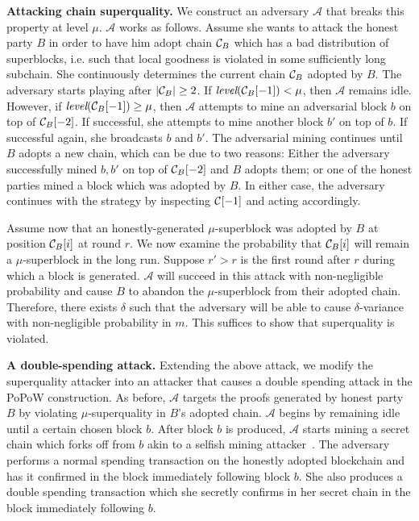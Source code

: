 \noindent
\textbf{Attacking chain superquality.}
\label{subsec.superquality-attack}
We construct an adversary $\mathcal{A}$ that breaks this property at level $\mu$.
$\mathcal{A}$ works as follows. Assume she wants to attack the honest party $B$
in order to have him adopt chain $\mathcal{C}_B$ which has a bad distribution of
superblocks, i.e. such that local goodness is violated in some sufficiently long
subchain. She continuously determines the current chain $\mathcal{C}_B$ adopted by
$B$. The adversary starts playing after $|\mathcal{C}_B| \geq 2$. If
$\textit{level}(\mathcal{C}_B[-1]) < \mu$, then $\mathcal{A}$ remains idle. However,
if $\textit{level}(\mathcal{C}_B[-1]) \geq \mu$, then $\mathcal{A}$ attempts to mine
an adversarial block $b$ on top of $\mathcal{C}_B[-2]$. If successful,  she attempts
to mine another block $b'$ on top of $b$. If successful again, she broadcasts
$b$ and $b'$. The adversarial mining continues until $B$ adopts a new chain,
which can be due to two reasons: Either the adversary successfully mined $b, b'$
on top of $\mathcal{C}_B[-2]$ and $B$ adopts them; or one of the honest parties mined
a block which was adopted by $B$. In either case, the adversary continues with
the strategy by inspecting $\mathcal{C}[-1]$ and acting accordingly.

Assume now that an honestly-generated $\mu$-superblock was adopted by $B$ at
position $\mathcal{C}_B[i]$ at round $r$. We now examine the probability that
$\mathcal{C}_B[i]$ will remain a $\mu$-superblock in the long run. Suppose $r' > r$
is the first round after $r$ during which a block is generated. $\mathcal{A}$
will succeed in this attack with non-negligible probability and cause $B$ to
abandon the $\mu$-superblock from their adopted chain. Therefore, there  
exists $\delta$ such that the adversary will be able to cause $\delta$-variance
with non-negligible probability in $m$. This suffices to show that superquality
is violated.

\noindent
\textbf{A double-spending attack. }
Extending the above attack, we modify the superquality attacker into an attacker
that causes a double spending attack in the PoPoW construction. As before,
$\mathcal{A}$ targets the proofs generated by honest party $B$ by violating
$\mu$-superquality in $B$'s adopted chain. $\mathcal{A}$ begins by remaining
idle until a certain chosen block $b$. After block $b$ is produced,
$\mathcal{A}$ starts mining a secret chain which forks off from $b$ akin to a
selfish mining attacker~\cite{selfish}. The adversary performs a normal spending
transaction on the honestly adopted blockchain and has it confirmed in the block
immediately following block $b$. She also produces a double spending transaction
which she secretly confirms in her secret chain in the block immediately
following $b$.

